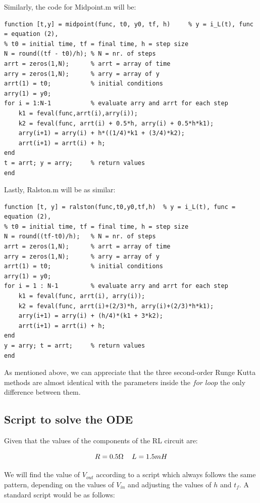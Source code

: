 \documentclass[11pt,a4paper]{article}
\begin{document}
\vspace{-2mm}Similarly, the code for Midpoint.m will be:
\vspace{-1mm}
\begin{verbatim}
function [t,y] = midpoint(func, t0, y0, tf, h)     % y = i_L(t), func = equation (2),
% t0 = initial time, tf = final time, h = step size
N = round((tf - t0)/h); % N = nr. of steps
arrt = zeros(1,N);      % arrt = array of time
arry = zeros(1,N);      % arry = array of y
arrt(1) = t0;           % initial conditions
arry(1) = y0;
for i = 1:N-1           % evaluate arry and arrt for each step
    k1 = feval(func,arrt(i),arry(i));
    k2 = feval(func, arrt(i) + 0.5*h, arry(i) + 0.5*h*k1);
    arry(i+1) = arry(i) + h*((1/4)*k1 + (3/4)*k2);
    arrt(i+1) = arrt(i) + h;
end
t = arrt; y = arry;     % return values
end
\end{verbatim}

Lastly, Ralston.m will be as similar:

\begin{verbatim}
function [t, y] = ralston(func,t0,y0,tf,h)  % y = i_L(t), func = equation (2),
% t0 = initial time, tf = final time, h = step size
N = round((tf-t0)/h);   % N = nr. of steps
arrt = zeros(1,N);      % arrt = array of time
arry = zeros(1,N);      % arry = array of y
arrt(1) = t0;           % initial conditions
arry(1) = y0;
for i = 1 : N-1         % evaluate arry and arrt for each step
    k1 = feval(func, arrt(i), arry(i));
    k2 = feval(func, arrt(i)+(2/3)*h, arry(i)+(2/3)*h*k1);
    arry(i+1) = arry(i) + (h/4)*(k1 + 3*k2);
    arrt(i+1) = arrt(i) + h;
end
y = arry; t = arrt;     % return values
end
\end{verbatim}

As mentioned above, we can appreciate that the three second-order Runge Kutta methods are almost identical with the parameters inside the $for$ $loop$ the only difference between them.

\newpage
\subsection{Script to solve the ODE}
Given that the values of the components of the RL circuit are:

\[R = 0.5\Omega\ \hspace{3mm} L = 1.5mH\]

We will find the value of $V_{out}$ according to a script which always follows the same pattern, depending on the values of $V_{in}$ and adjusting the values of $h$ and $t_f$. A standard script would be as follows:
\end{document}
